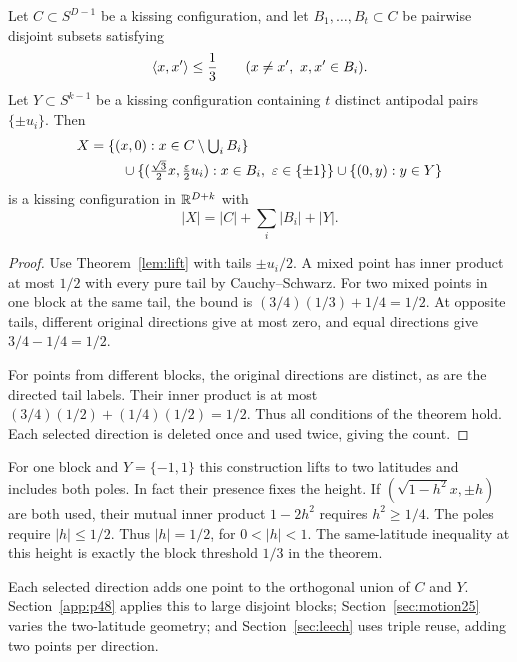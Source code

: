 \begin{theorem}\label{thm:block-lift}
Let $C\subset S^{D-1}$ be a kissing configuration, and let
$B_1,\ldots,B_t\subset C$ be pairwise disjoint subsets satisfying
\[
 \langle x,x'\rangle\le\frac13\qquad(x\ne x',\ x,x'\in B_i).
\]
Let $Y\subset S^{k-1}$ be a kissing configuration containing $t$
distinct antipodal pairs $\{\pm u_i\}$. Then
\begin{align}
 X={}&\{(x,0):x\in C\setminus\textstyle\bigcup_iB_i\}\nonumber\\
 &\quad\cup\{(\tfrac{\sqrt3}{2}x,\tfrac{\varepsilon}2u_i):
                     x\in B_i,\ \varepsilon\in\{\pm1\}\}
       \cup\{(0,y):y\in Y\}\label{eq:antipodal-lift}
\end{align}
is a kissing configuration in $\mathbb R^{D+k}$ with
\begin{equation}\label{eq:antipodal-count}
 |X|=|C|+\sum_i|B_i|+|Y|.
\end{equation}
\end{theorem}
\begin{proof}
Use Theorem~\ref{lem:lift} with tails $\pm u_i/2$. A mixed point has
inner product at most $1/2$ with every pure tail by Cauchy--Schwarz.
For two mixed points in one block at the same tail, the bound is
$(3/4)(1/3)+1/4=1/2$. At opposite tails, different original directions
give at most zero, and equal directions give $3/4-1/4=1/2$.

For points from different blocks, the original directions are distinct,
as are the directed tail labels. Their inner product is at most
$(3/4)(1/2)+(1/4)(1/2)=1/2$. Thus all conditions of the theorem hold.
Each selected direction is deleted once and used twice, giving the count.
\end{proof}

For one block and $Y=\{-1,1\}$ this construction lifts to two latitudes
and includes both poles. In fact their presence fixes the height.
If $(\sqrt{1-h^2}x,\pm h)$ are both used, their mutual inner product
$1-2h^2$ requires $h^2\ge1/4$. The poles require $|h|\le1/2$.
Thus $|h|=1/2$, for $0<|h|<1$. The same-latitude inequality at this
height is exactly the block threshold $1/3$ in the theorem.

Each selected direction adds one point to the orthogonal union of $C$
and $Y$. Section~\ref{app:p48} applies this to large disjoint blocks;
Section~\ref{sec:motion25} varies the two-latitude geometry; and
Section~\ref{sec:leech} uses triple reuse, adding two points per direction.
